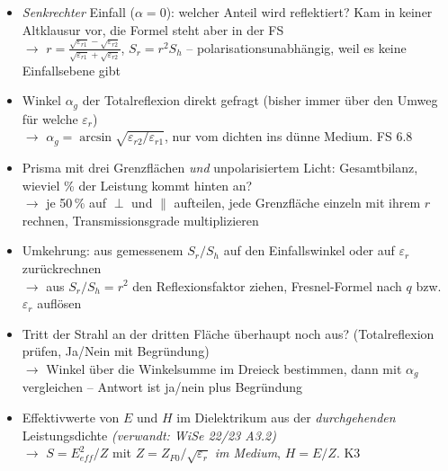 \documentclass[a4paper,10pt]{article}
\begin{document}
\par\vspace{5mm}
\begin{tcolorbox}[colback=A3Farbe!4, colframe=A3Farbe!55, boxrule=0.5pt, arc=1mm, left=3mm, right=2mm, top=2mm, bottom=2mm, breakable, title={\sffamily\bfseries\small Was diesmal neu drankommen könnte \normalfont\itshape\footnotesize -- eigene Prognose (keine offizielle Ankündigung): Umkehrungen, Kombinationen und Transfers zwischen den Aufgabentypen}, coltitle=white, colbacktitle=A3Farbe!70]
\sffamily\small
\begin{itemize}\setlength{\itemsep}{2.2mm}\setlength{\leftmargini}{4mm}
\item \emph{Senkrechter} Einfall ($\alpha=0$): welcher Anteil wird reflektiert? Kam in keiner Altklausur vor, die Formel steht aber in der FS\\[0.6mm] {\footnotesize\color{A3Farbe}$\rightarrow$ $r=\frac{\sqrt{\varepsilon_{r1}}-\sqrt{\varepsilon_{r2}}}{\sqrt{\varepsilon_{r1}}+\sqrt{\varepsilon_{r2}}}$, $S_r=r^2S_h$ -- polarisationsunabhängig, weil es keine Einfallsebene gibt}
\item Winkel $\alpha_g$ der Totalreflexion direkt gefragt (bisher immer über den Umweg \glqq für welche $\varepsilon_r$\grqq)\\[0.6mm] {\footnotesize\color{A3Farbe}$\rightarrow$ $\alpha_g=\arcsin\sqrt{\varepsilon_{r2}/\varepsilon_{r1}}$, nur vom dichten ins dünne Medium. FS 6.8}
\item Prisma mit drei Grenzflächen \emph{und} unpolarisiertem Licht: Gesamtbilanz, wieviel \% der Leistung kommt hinten an?\\[0.6mm] {\footnotesize\color{A3Farbe}$\rightarrow$ je 50\,\% auf $\perp$ und $\parallel$ aufteilen, jede Grenzfläche einzeln mit ihrem $r$ rechnen, Transmissionsgrade multiplizieren}
\item Umkehrung: aus gemessenem $S_r/S_h$ auf den Einfallswinkel oder auf $\varepsilon_r$ zurückrechnen\\[0.6mm] {\footnotesize\color{A3Farbe}$\rightarrow$ aus $S_r/S_h=r^2$ den Reflexionsfaktor ziehen, Fresnel-Formel nach $q$ bzw.\ $\varepsilon_r$ auflösen}
\item Tritt der Strahl an der dritten Fläche überhaupt noch aus? (Totalreflexion prüfen, Ja/Nein mit Begründung)\\[0.6mm] {\footnotesize\color{A3Farbe}$\rightarrow$ Winkel über die Winkelsumme im Dreieck bestimmen, dann mit $\alpha_g$ vergleichen -- Antwort ist ja/nein plus Begründung}
\item Effektivwerte von $E$ und $H$ im Dielektrikum aus der \emph{durchgehenden} Leistungsdichte \textcolor{Grau}{\itshape(verwandt: WiSe 22/23 A3.2)}\\[0.6mm] {\footnotesize\color{A3Farbe}$\rightarrow$ $S=E_{eff}^2/Z$ mit $Z=Z_{F0}/\sqrt{\varepsilon_r}$ \emph{im Medium}, $H=E/Z$. K3}
\end{itemize}\end{tcolorbox}
\end{document}
